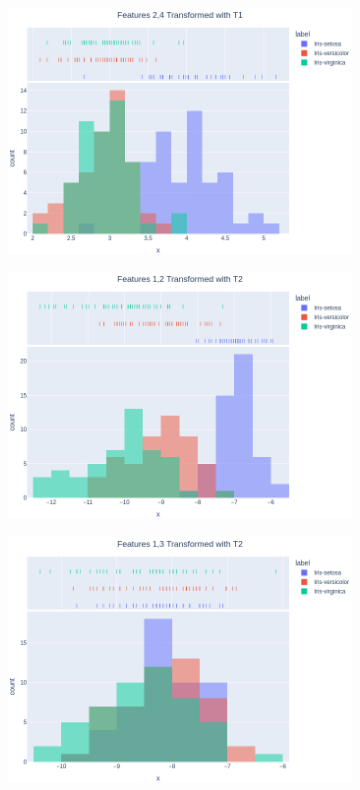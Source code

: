 \documentclass[14pt,a4]{article}
\begin{document}
\begin{figure}[h]
\begin{subfigure}{0.32\linewidth}
        \includegraphics[width=\linewidth]{images/q3/p2/24T1.png}
    \end{subfigure}
    \newline
    \begin{subfigure}{0.32\linewidth}
        \centering
        \includegraphics[width=\linewidth]{images/q3/p2/12T2.png}
    \end{subfigure}
    \hfill
    \begin{subfigure}{0.32\linewidth}
        \centering
        \includegraphics[width=\linewidth]{images/q3/p2/13T2.png}

\end{subfigure}
\end{figure}
\end{document}
